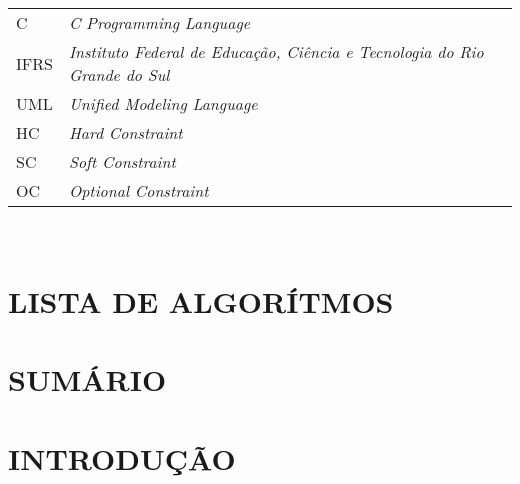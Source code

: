 \documentclass[12pt,a4paper]{article}
\begin{document}
	\begin{tabular}{p{3cm} p{}}
	  C & \textit{C Programming Language} \\
	  IFRS & \textit{Instituto Federal de Educação, Ciência e Tecnologia do Rio Grande do Sul} \\
	  UML & \textit{Unified Modeling Language} \\
	  HC & \textit{Hard Constraint} \\
	  SC & \textit{Soft Constraint} \\
	  OC & \textit{Optional Constraint}
	\end{tabular}\\


	\newpage


	\thispagestyle{empty}
	\section*{LISTA DE ALGORÍTMOS}


	\newpage



	\thispagestyle{empty}
	\section*{SUMÁRIO}

	\begingroup
		\let\clearpage\relax
		\vspace{-1cm} %
		\tableofcontents
	\endgroup

	\newpage


	\section{INTRODUÇÃO}
\end{document}

